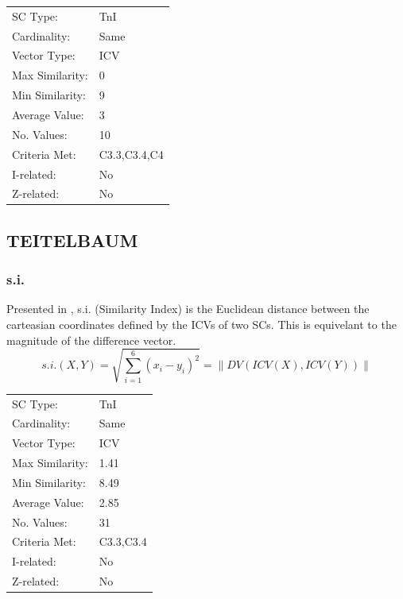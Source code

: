 \documentclass{article}
\begin{document}
\begin{center}
\begin{tabular}{ll}
 SC Type:         &  TnI           \\
 Cardinality:     &  Same          \\
 Vector Type:     &  ICV           \\
 Max Similarity:  &  0             \\
 Min Similarity:  &  9             \\
 Average Value:   &  3             \\
 No. Values:      &  10            \\
 Criteria Met:    &  C3.3,C3.4,C4  \\
 I-related:       &  No            \\
 Z-related:       &  No            \\
\end{tabular}
\end{center}
\subsection{TEITELBAUM}
\label{sec-13-3}
\subsubsection{s.i.}
\label{sec-13-3-1}

Presented in \citet[pp. 88]{Teitelbaum1965}, s.i. (Similarity Index)
is the Euclidean distance between the carteasian coordinates defined
by the ICVs of two SCs. This is equivelant to the magnitude of the
difference vector.
$$s.i.(X,Y)=\sqrt{\sum_{i=1}^{6}(x_{i}-y_{i})^{2}}=\left\|DV(ICV(X),ICV(Y))\right\|$$

\begin{center}
\begin{tabular}{ll}
 SC Type:         &  TnI        \\
 Cardinality:     &  Same       \\
 Vector Type:     &  ICV        \\
 Max Similarity:  &  1.41       \\
 Min Similarity:  &  8.49       \\
 Average Value:   &  2.85       \\
 No. Values:      &  31         \\
 Criteria Met:    &  C3.3,C3.4  \\
 I-related:       &  No         \\
 Z-related:       &  No         \\
\end{tabular}
\end{center}
\end{document}
